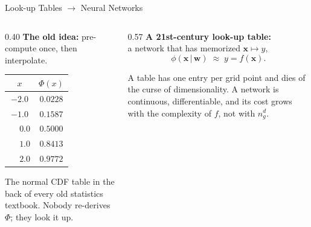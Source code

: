 \documentclass[aspectratio=169,11pt]{beamer}
\newcommand{\emphc}[1]{\textcolor{harvardcrimson}{#1}}
\newcommand{\x}{\bm{x}}
\newcommand{\netw}{\bm{w}}              %
\newcommand{\surr}{\phi}                %
\begin{document}
\begin{frame}{Look-up Tables $\to$ Neural Networks}
\begin{columns}[T]
\begin{column}{0.40\textwidth}
\textbf{The old idea:} pre-compute once, then interpolate.
\vspace{2pt}
\begin{center}
\footnotesize
\begin{tabular}{cc}
\toprule
$x$ & $\Phi(x)$ \\
\midrule
$-2.0$ & $0.0228$ \\
$-1.0$ & $0.1587$ \\
$\phantom{-}0.0$ & $0.5000$ \\
$\phantom{-}1.0$ & $0.8413$ \\
$\phantom{-}2.0$ & $0.9772$ \\
\bottomrule
\end{tabular}
\end{center}
\vspace{2pt}
{\footnotesize The normal CDF table in the back of every old statistics textbook. Nobody re-derives $\Phi$; they look it up.}
\end{column}

\begin{column}{0.57\textwidth}
\textbf{A 21st-century look-up table:}\\[2pt]
a network that has memorized $\x \mapsto y$,
\[
\surr(\x \,|\, \netw) \;\approx\; y = f(\x).
\]
\vspace{-6pt}
\begin{center}
\end{center}
\vspace{2pt}
{\footnotesize A table has one entry per grid point and dies of the curse of dimensionality. A network is \emphc{continuous}, \emphc{differentiable}, and its cost grows with the complexity of $f$, not with $n_g^{d}$.}
\end{column}
\end{columns}
\end{frame}
\end{document}
